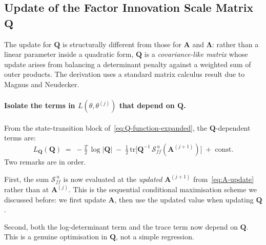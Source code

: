 \documentclass[11pt, a4paper, oneside]{article}
\newcommand{\mL}{\boldsymbol{\Lambda}}
\newcommand{\mA}{\mathbf{A}}
\newcommand{\mQ}{\mathbf{Q}}
\begin{document}
\subsection{Update of the Factor Innovation Scale Matrix $\mQ$}
\label{subsec:update-Q}

The update for $\mQ$ is structurally different from those for $\mA$
and $\mL$: rather than a linear parameter inside a
quadratic form, $\mQ$ is a \emph{covariance-like matrix} whose
update arises from balancing a determinant penalty against a
weighted sum of outer products. The derivation uses a standard matrix
calculus result due to Magnus and Neudecker.

\paragraph{Isolate the terms in $L(\theta, \theta^{(j)})$ that depend on $\mathbf{Q}$.}
From the state-transition block of~\eqref{eq:Q-function-expanded},
the $\mQ$-dependent terms are:
\begin{equation}
L_{\mQ}(\mQ) \;=\; -\tfrac{T}{2}\,\log|\mQ| \;-\; \tfrac{1}{2}\,\mathrm{tr}\!\Big[\mQ^{-1}\, \mathcal{S}_{ff}^{\,u}(\mA^{(j+1)})\Big]
\;+\; \text{const}.
\label{eq:L-Q-step1}
\end{equation}
Two remarks are in order.

First, the sum $\mathcal{S}_{ff}^{\,u}$ is now evaluated at the
\emph{updated} $\mA^{(j+1)}$ from~\eqref{eq:A-update} rather than at
$\mA^{(j)}$. This is the sequential conditional maximisation scheme we
discussed before: we first update $\mA$, then
use the updated value when updating $\mQ$.

Second, both the log-determinant term and the trace term now depend on
$\mQ$. This is a genuine optimisation in $\mQ$, not a simple regression.
\end{document}
